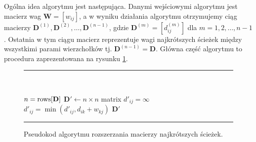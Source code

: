 \documentclass[12pt,a4paper]{book}
\newenvironment{myalgorithm}
{\rule{\textwidth}{0.5mm}\\\SetAlCapSty{}\SetAlgoNoEnd\SetAlgoNoLine\begin{algorithm}}{\end{algorithm}\rule{\textwidth}{0.5mm}}
\theoremstyle{definition}
\numberwithin{equation}{chapter}
\begin{document}
Ogólna idea algorytmu jest następująca. Danymi wejściowymi algorytmu jest macierz wag $\mathbf{W} = [w_{ij}]$, a w wyniku działania algorytmu otrzymujemy ciąg macierzy $\mathbf{D}^{(1)}, \mathbf{D}^{(2)}, \dots, \mathbf{D}^{(n-1)}$, gdzie $\mathbf{D}^{(m)} = [d_{ij}^{(m)}]$ dla $m=1,2,\dots,n-1$. Ostatnia w tym ciągu macierz reprezentuje wagi najkrótszych ścieżek między wszystkimi parami wierzchołków tj. $\mathbf{D}^{(n-1)} = \mathbf{D}$. Główna część algorytmu to procedura zaprezentowana na rysunku \ref{Matrix_multiply_shortest_paths}.

\begin{figure}[ht]
\begin{myalgorithm}[H]
	\DontPrintSemicolon
	{
		$n = \mbox{rows[\textbf{D}]}$\;
		$\mathbf{D}' \leftarrow n \times n$ matrix\;
		{
			{
				$d'_{i j} = \infty$\;	
				{
					$d'_{i j} = \min(d'_{i j}, d_{i k} + w_{k j})$\;
				}
			}
		}
		\Return $\mathbf{D}'$\;
	}
\end{myalgorithm}
\caption{Pseudokod algorytmu rozszerzania macierzy najkrótszych ścieżek.}
\label{Matrix_multiply_shortest_paths}
\end{figure}
\end{document}
